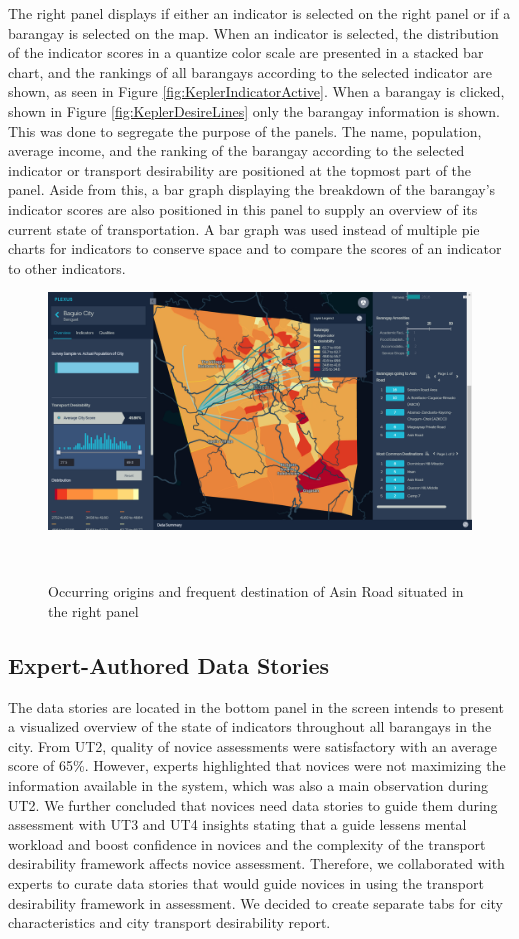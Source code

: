 \documentclass{sigchi}
\begin{document}
The right panel displays if either an indicator is selected on the right panel or if a barangay is selected on the map. When an indicator is selected, the distribution of the indicator scores in a quantize color scale are presented in a stacked bar chart, and the rankings of all barangays according to the selected indicator are shown, as seen in Figure \ref{fig:KeplerIndicatorActive}. When a barangay is clicked, shown in Figure \ref{fig:KeplerDesireLines} only the barangay information is shown. This was done to segregate the purpose of the panels. The name, population, average income, and the ranking of the barangay according to the selected indicator or transport desirability are positioned at the topmost part of the panel. Aside from this, a bar graph displaying the breakdown of the barangay's indicator scores are also positioned in this panel to supply an overview of its current state of transportation. A bar graph was used instead of multiple pie charts for indicators to conserve space and to compare the scores of an indicator to other indicators.


\begin{figure}
\centering
  \includegraphics[width=0.9\columnwidth]{figures/overview-barangay-2.PNG}
  \caption{Occurring origins and frequent destination of Asin Road situated in the right panel}~\label{fig:KeplerBarangayContd}
\end{figure}

\subsection{Expert-Authored Data Stories}
The data stories are located in the bottom panel in the screen intends to present a visualized overview of the state of indicators throughout all barangays in the city. From UT2, quality of novice assessments were satisfactory with an average score of 65\%. However, experts highlighted that novices were not maximizing the information available in the system, which was also a main observation during UT2. We further concluded that novices need data stories to guide them during assessment with UT3 and UT4 insights stating that a guide lessens mental workload and boost confidence in novices and the complexity of the transport desirability framework affects novice assessment. Therefore, we collaborated with experts to curate data stories that would guide novices in using the transport desirability framework in assessment. We decided to create separate tabs for city characteristics and city transport desirability report. 
\end{document}
